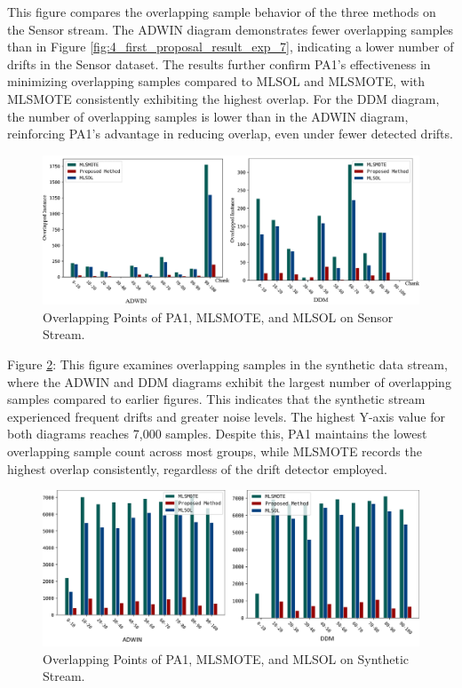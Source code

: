 This figure compares the overlapping sample behavior of the three methods on the Sensor stream. The ADWIN diagram demonstrates fewer overlapping samples than in Figure \ref{fig:4_first_proposal_result_exp_7}, indicating a lower number of drifts in the Sensor dataset. The results further confirm PA1’s effectiveness in minimizing overlapping samples compared to MLSOL and MLSMOTE, with MLSMOTE consistently exhibiting the highest overlap. For the DDM diagram, the number of overlapping samples is lower than in the ADWIN diagram, reinforcing PA1’s advantage in reducing overlap, even under fewer detected drifts.
\begin{figure}[H]
	\centering
	\includegraphics[width=0.9\linewidth]{4_Imbalanced/figures/exp_8.png}
  \caption{Overlapping Points of PA1, MLSMOTE, and MLSOL on Sensor Stream.}
	\label{fig:4_first_proposal_result_exp_8}
\end{figure}
Figure \ref{fig:4_first_proposal_result_exp_9}:
This figure examines overlapping samples in the synthetic data stream, where the ADWIN and DDM diagrams exhibit the largest number of overlapping samples compared to earlier figures. This indicates that the synthetic stream experienced frequent drifts and greater noise levels. The highest Y-axis value for both diagrams reaches 7,000 samples. Despite this, PA1 maintains the lowest overlapping sample count across most groups, while MLSMOTE records the highest overlap consistently, regardless of the drift detector employed.
\begin{figure}[H]
	\centering
	\includegraphics[width=0.9\linewidth]{4_Imbalanced/figures/exp_9.png}
  \caption{Overlapping Points of PA1, MLSMOTE, and MLSOL on Synthetic Stream.}
	\label{fig:4_first_proposal_result_exp_9}
\end{figure}

